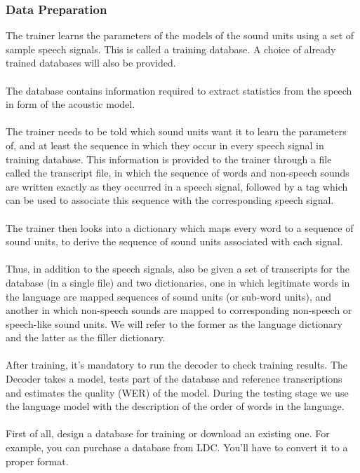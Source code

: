\documentclass[12pt,a4paper,oneside]{memoir}
\begin{document}
\subsubsection{Data Preparation}

The trainer learns the parameters of the models of the sound units using a set of sample speech signals. This is called a training database. A choice of already trained databases will also be provided.\\\\
The database contains information required to extract statistics from the speech in form of the acoustic model.\\\\
The trainer needs to be told which sound units want it to learn the parameters of, and at least the sequence in which they occur in every speech signal in training database. This information is provided to the trainer through a file called the transcript file, in which the sequence of words and non-speech sounds are written exactly as they occurred in a speech signal, followed by a tag which can be used to associate this sequence with the corresponding speech signal.\\\\
The trainer then looks into a dictionary which maps every word to a sequence of sound units, to derive the sequence of sound units associated with each signal.\\\\
Thus, in addition to the speech signals, also be given a set of transcripts for the database (in a single file) and two dictionaries, one in which legitimate words in the language are mapped sequences of sound units (or sub-word units), and another in which non-speech sounds are mapped to corresponding non-speech or speech-like sound units. We will refer to the former as the language dictionary and the latter as the filler dictionary.\\\\
After training, it's mandatory to run the decoder to check training results. The Decoder takes a model, tests part of the database and reference transcriptions and estimates the quality (WER) of the model. During the testing stage we use the language model with the description of the order of words in the language.\\\\
First of all, design a database for training or download an existing one. For example, you can purchase a database from LDC. You'll have to convert it to a proper format. 
\end{document}
